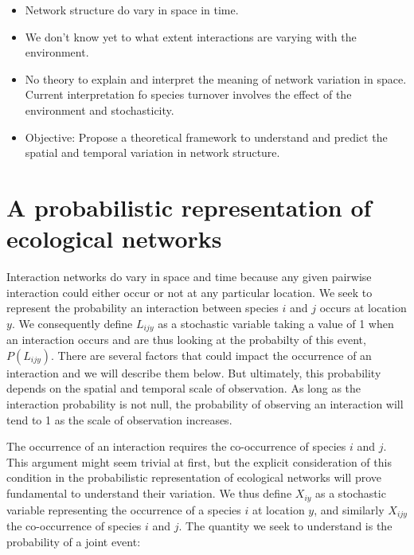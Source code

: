 \documentclass[12pt]{article}
\begin{document}
\begin{itemize}
\item Network structure do vary in space in time. \\ 

\item We don't know yet to what extent interactions are varying with the
environment. \\

\item No theory to explain and interpret the meaning of network variation in space.
Current interpretation fo species turnover involves the effect of the
environment and stochasticity. \\

\item Objective: Propose a theoretical framework to understand and predict the
spatial and temporal variation in network structure.\\

\end{itemize}

\newpage
\section*{A probabilistic representation of ecological networks}

Interaction networks do vary in space and time because any given pairwise
interaction could either occur or not at any particular location. We seek to
represent the probability an interaction between species $i$ and $j$ occurs at
location $y$. We consequently define $L_{ijy}$ as a stochastic variable taking a
value of 1 when an interaction occurs and are thus looking at the probabilty of
this event, $P(L_{ijy})$. There are several factors that could impact the
occurrence of an interaction and we will describe them below. But ultimately,
this probability depends on the spatial and temporal scale of observation. As
long as the interaction probability is not null, the probability of observing an
interaction will tend to 1 as the scale of observation increases. 
	  
The occurrence of an interaction requires the co-occurrence of species
$i$ and $j$. This argument might seem trivial at first, but the explicit
consideration of this condition in the probabilistic representation of
ecological networks will prove fundamental to understand their variation. We
thus define $X_{iy}$ as a stochastic variable representing the occurrence of a
species $i$ at location $y$, and similarly $X_{ijy}$ the co-occurrence of species
$i$ and $j$. The quantity we seek to understand is the probability of a joint
event:
\end{document}
